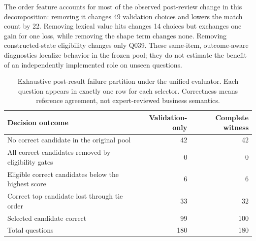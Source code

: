 \documentclass[information,article,submit,moreauthors]{Definitions/mdpi}
\begin{document}
\begin{table}[htbp]
\caption{Post-review role-utilization and single-component diagnostics under the unified evaluator. Changes, gains, and losses are relative to the stated parent and use the original candidate order.}
\label{tab:role-ablation}
\centering
\small
{}
\end{table}

The order feature accounts for most of the observed post-review change in this decomposition: removing it changes 49 validation choices and lowers the match count by 22. Removing lexical value hits changes 14 choices but exchanges one gain for one loss, while removing the shape term changes none. Removing constructed-state eligibility changes only Q039. These same-item, outcome-aware diagnostics localize behavior in the frozen pool; they do not estimate the benefit of an independently implemented role on unseen questions.

\begin{table}[htbp]
\caption{Exhaustive post-result failure partition under the unified evaluator. Each question appears in exactly one row for each selector. Correctness means reference agreement, not expert-reviewed business semantics.}
\label{tab:failure-partition}\centering\small
\begin{tabular}{lrr}
\toprule
Decision outcome & Validation-only & Complete witness\\
\midrule
No correct candidate in the original pool & 42 & 42\\
All correct candidates removed by eligibility gates & 0 & 0\\
Eligible correct candidates below the highest score & 6 & 6\\
Correct top candidate lost through tie order & 33 & 32\\
Selected candidate correct & 99 & 100\\
\midrule
Total questions & 180 & 180\\
\bottomrule
\end{tabular}
\end{table}
\end{document}
